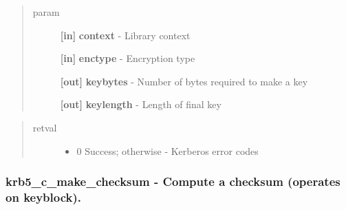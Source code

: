 \documentclass[letterpaper,10pt,english]{sphinxmanual}
\begin{document}
\begin{quote}\begin{description}
\item[{param}] \leavevmode
\textbf{{[}in{]}} \textbf{context} - Library context

\textbf{{[}in{]}} \textbf{enctype} - Encryption type

\textbf{{[}out{]}} \textbf{keybytes} - Number of bytes required to make a key

\textbf{{[}out{]}} \textbf{keylength} - Length of final key

\end{description}\end{quote}
\begin{quote}\begin{description}
\item[{retval}] \leavevmode\begin{itemize}
\item {} 
0   Success; otherwise - Kerberos error codes

\end{itemize}

\end{description}\end{quote}


\subsubsection{krb5\_c\_make\_checksum -  Compute a checksum (operates on keyblock).}
\label{appdev/refs/api/krb5_c_make_checksum::doc}\label{appdev/refs/api/krb5_c_make_checksum:krb5-c-make-checksum-compute-a-checksum-operates-on-keyblock}

\begin{fulllineitems}
\label{appdev/refs/api/krb5_c_make_checksum:krb5_c_make_checksum}
\end{fulllineitems}
\end{document}
